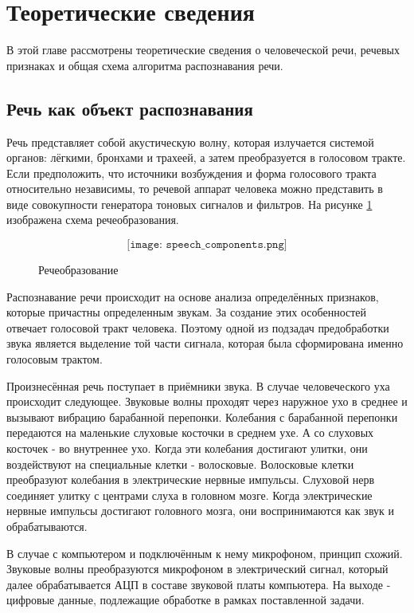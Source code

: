 \section{Теоретические сведения}
В этой главе рассмотрены теоретические сведения о человеческой речи, речевых признаках и общая схема алгоритма распознавания речи.

\subsection{Речь как объект распознавания}
Речь представляет собой акустическую волну, которая излучается системой органов: лёгкими, бронхами и трахеей, а затем преобразуется в голосовом тракте. Если предположить, что источники возбуждения и форма голосового тракта относительно независимы, то речевой аппарат человека можно представить в виде совокупности генератора тоновых сигналов и фильтров. На рисунке \ref{fig:speech_components} изображена схема речеобразования.

\begin{figure}[H]
	\[\texttt{[image: speech\_components.png]}\]
	\caption{Речеобразование}
	\label{fig:speech_components}
\end{figure}

Распознавание речи происходит на основе анализа определённых признаков, которые причастны определенным звукам. За создание этих особенностей отвечает голосовой тракт человека. Поэтому одной из подзадач предобработки звука является выделение той части сигнала, которая была сформирована именно голосовым трактом.

Произнесённая речь поступает в приёмники звука. В случае человеческого уха происходит следующее. Звуковые волны проходят через наружное ухо в среднее и вызывают вибрацию барабанной перепонки. Колебания с барабанной перепонки передаются на маленькие слуховые косточки в среднем ухе. А со слуховых косточек - во внутреннее ухо. Когда эти колебания достигают улитки, они воздействуют на специальные клетки - волосковые. Волосковые клетки преобразуют колебания в электрические нервные импульсы. Слуховой нерв соединяет улитку с центрами слуха в головном мозге. Когда электрические нервные импульсы достигают головного мозга, они воспринимаются как звук и обрабатываются.

В случае с компьютером и подключённым к нему микрофоном, принцип схожий. Звуковые волны преобразуются микрофоном в электрический сигнал, который далее обрабатывается АЦП в составе звуковой платы компьютера. На выходе - цифровые данные, подлежащие обработке в рамках поставленной задачи.

